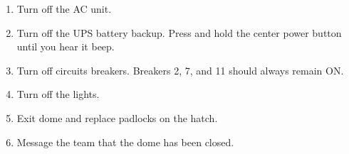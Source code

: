 \documentclass{article}
\begin{document}
		\begin{enumerate}
	
			\item Turn off the AC unit.
		
			\item Turn off the UPS battery backup. Press and hold the center power button until you hear it beep.
		
			\item Turn off circuits breakers. Breakers 2, 7, and 11 should always remain ON.
		
			\item Turn off the lights.
		
			\item Exit dome and replace padlocks on the hatch.
		
			\item Message the team that the dome has been closed.
		
		\end{enumerate}
	
\end{document}
